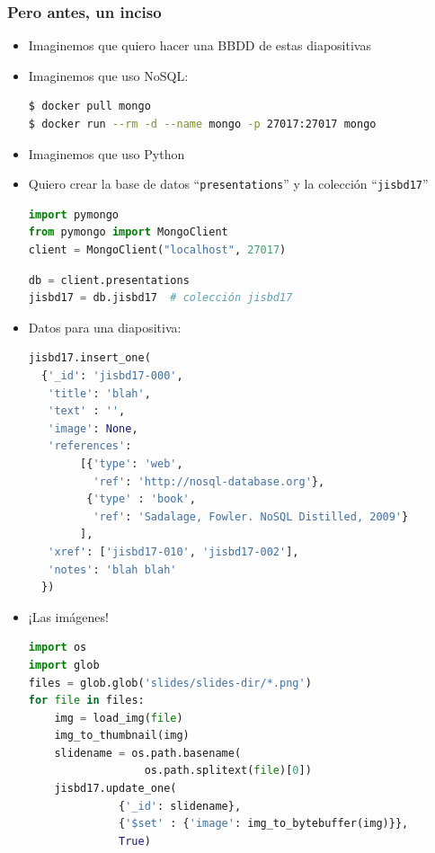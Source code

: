 \documentclass[14pt]{beamer}
\begin{document}
\begin{frame}
  \frametitle{Pero antes, un inciso}
  \begin{itemize}
  \item Imaginemos que quiero hacer una BBDD de estas diapositivas
  \item Imaginemos que uso NoSQL:
\begin{lstlisting}[language=bash]
$ docker pull mongo
$ docker run --rm -d --name mongo -p 27017:27017 mongo
\end{lstlisting}
  \item Imaginemos que uso Python

    \framebreak

  \item Quiero crear la base de datos ``{\tt presentations}'' y la colección
    ``{\tt jisbd17}''
\begin{lstlisting}[language=python]
import pymongo
from pymongo import MongoClient
client = MongoClient("localhost", 27017)
\end{lstlisting}

\begin{lstlisting}[language=python]
db = client.presentations
jisbd17 = db.jisbd17  # colección jisbd17
\end{lstlisting}

    \framebreak

\item Datos para una diapositiva:

\begin{lstlisting}[language=python]
jisbd17.insert_one(
  {'_id': 'jisbd17-000',
   'title': 'blah',
   'text' : '',
   'image': None,
   'references':
        [{'type': 'web',
          'ref': 'http://nosql-database.org'},
         {'type' : 'book',
          'ref': 'Sadalage, Fowler. NoSQL Distilled, 2009'}
        ],
   'xref': ['jisbd17-010', 'jisbd17-002'],
   'notes': 'blah blah'
  })
\end{lstlisting}

\framebreak

\item ¡Las imágenes!

\begin{lstlisting}[language=python]
import os
import glob
files = glob.glob('slides/slides-dir/*.png')
for file in files:
    img = load_img(file)
    img_to_thumbnail(img)
    slidename = os.path.basename(
                  os.path.splitext(file)[0])
    jisbd17.update_one(
              {'_id': slidename},
              {'$set' : {'image': img_to_bytebuffer(img)}},
              True)
\end{lstlisting}


\end{itemize}
\end{frame}
\end{document}
